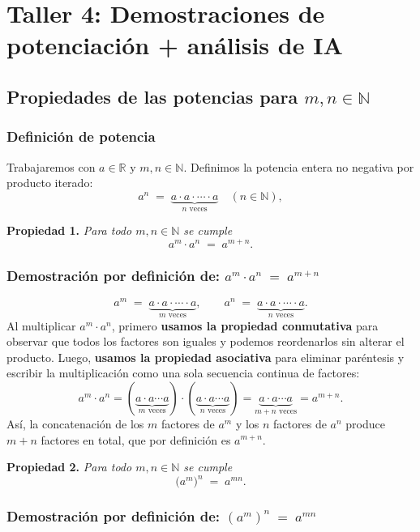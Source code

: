 \documentclass{article}
\begin{document}
\section{Taller 4: Demostraciones de potenciación + análisis de IA}

\subsection{Propiedades de las potencias para $m,n \in \mathbb{N}$}

\subsubsection{Definición de potencia}

Trabajaremos con $a \in \mathbb{R}$ y $m,n \in \mathbb{N}$.  
Definimos la potencia entera no negativa por producto iterado:
\[
a^n \;=\; \underbrace{a \cdot a \cdot \dotsb \cdot a}_{n \text{ veces}}
\quad (n \in \mathbb{N}),
\]

\medskip
\noindent\textbf{Propiedad 1.} \emph{Para todo $m,n \in \mathbb{N}$ se cumple}
\[
a^m \cdot a^n \;=\; a^{m+n}.
\]

\subsubsection{Demostración por definición de: \(a^m \cdot a^n \;=\; a^{m+n}\)}

\[
a^m \;=\; \underbrace{a \cdot a \cdot \dotsb \cdot a}_{m \text{ veces}},
\qquad
a^n \;=\; \underbrace{a \cdot a \cdot \dotsb \cdot a}_{n \text{ veces}}.
\]
Al multiplicar $a^m \cdot a^n$,
primero \textbf{usamos la propiedad conmutativa} para observar que todos los factores son iguales y podemos reordenarlos sin alterar el producto.  
Luego, \textbf{usamos la propiedad asociativa} para eliminar paréntesis y escribir la multiplicación como una sola secuencia continua de factores:
\[
a^m \cdot a^n
= 
(\underbrace{a \cdot a \cdots a}_{m \text{ veces}})
\cdot 
(\underbrace{a \cdot a \cdots a}_{n \text{ veces}})
=
\underbrace{a \cdot a \cdots a}_{m+n \text{ veces}}
= a^{m+n}.
\]
Así, la concatenación de los $m$ factores de $a^m$ y los $n$ factores de $a^n$
produce $m+n$ factores en total, que por definición es $a^{m+n}$.
\qedhere

\medskip
\noindent\textbf{Propiedad 2.} \emph{Para todo $m,n \in \mathbb{N}$ se cumple}
\[
\bigl(a^m\bigr)^n \;=\; a^{mn}.
\]

\subsubsection{Demostración por definición de: \((a^m)^n \;=\; a^{mn}\)}
\end{document}
